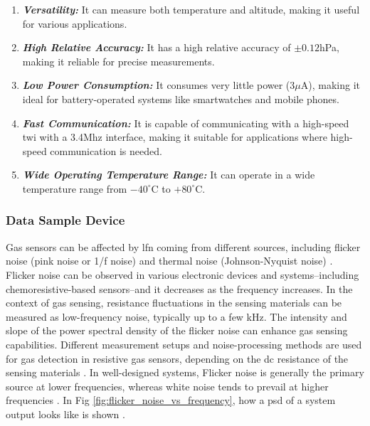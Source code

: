 \begin{itemize}
        \begin{enumerate}
            \item \textbf{\textit{Versatility:}} It can measure both temperature and altitude, making it useful for various applications.

            \item \textbf{\textit{High Relative Accuracy:}} It has a high relative accuracy of $\pm0.12$hPa, making it reliable for precise measurements.

            \item \textbf{\textit{Low Power Consumption:}} It consumes very little power ($3\mu$A), making it ideal for battery-operated systems like smartwatches and mobile phones.

            \item \textbf{\textit{Fast Communication:}} It is capable of communicating with a high-speed \acrfull{twi} with a 3.4Mhz interface, making it suitable for applications where high-speed communication is needed.

            \item \textbf{\textit{Wide Operating Temperature Range:}} It can operate in a wide temperature range from $-40^{\circ}$C to $+80^{\circ}$C.
        \end{enumerate}
\end{itemize}


\subsubsection{Data Sample Device}
\label{sec:methodology:dev_methodology:sensors:dsd}
\hspace{8pt}
Gas sensors can be affected by \acrfull{lfn} coming from different sources, including flicker noise (pink noise or 1/f noise) and thermal noise (Johnson-Nyquist noise) \cite{Kwon_2014, wonjun_2023,smulko_2024}. \\

Flicker noise can be observed in various electronic devices and systems--including chemoresistive-based sensors--and it decreases as the frequency increases. In the context of gas sensing, resistance fluctuations in the sensing materials can be measured as low-frequency noise, typically up to a few kHz. The intensity and slope of the power spectral density of the flicker noise can enhance gas sensing capabilities. Different measurement setups and noise-processing methods are used for gas detection in resistive gas sensors, depending on the \acrfull{dc} resistance of the sensing materials \cite{Kwon_2014, kiely_2017}. In well-designed systems, Flicker noise is generally the primary source at lower frequencies, whereas white noise tends to prevail at higher frequencies \cite{bahreyni_2009}. In Fig \ref{fig:flicker_noise_vs_frequency}, how a \acrfull{psd} of a system output looks like is shown \cite{bahreyni_2009}.

